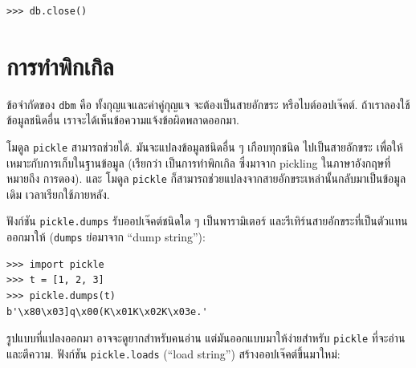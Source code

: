 \begin{verbatim}
>>> db.close()
\end{verbatim}
%


\section{การทำพิกเกิล}


ข้อจำกัดของ \texttt{dbm} คือ ทั้งกุญแจและค่าคู่กุญแจ จะต้องเป็นสายอักขระ หรือไบต์ออปเจ๊คต์.
ถ้าเราลองใช้ข้อมูลชนิดอื่น เราจะได้เห็นข้อความแจ้งข้อผิดพลาดออกมา.
 


โมดูล \texttt{pickle} สามารถช่วยได้.
มันจะแปลงข้อมูลชนิดอื่น ๆ เกือบทุกชนิด
ไปเป็นสายอักขระ เพื่อให้เหมาะกับการเก็บในฐานข้อมูล 
(เรียกว่า เป็นการทำพิกเกิล ซึ่งมาจาก pickling ในภาษาอังกฤษที่หมายถึง การดอง).
และ โมดูล \texttt{pickle} ก็สามารถช่วยแปลงจากสายอักขระเหล่านั้นกลับมาเป็นข้อมูลเดิม เวลาเรียกใช้ภายหลัง.


ฟังก์ชัน \texttt{pickle.dumps} รับออปเจ๊คต์ชนิดใด ๆ เป็นพารามิเตอร์
และรีเทิร์นสายอักขระที่เป็นตัวแทนออกมาให้ 
(\texttt{dumps} ย่อมาจาก ``dump string''):

\begin{verbatim}
>>> import pickle
>>> t = [1, 2, 3]
>>> pickle.dumps(t)
b'\x80\x03]q\x00(K\x01K\x02K\x03e.'
\end{verbatim}
%
%
รูปแบบที่แปลงออกมา อาจจะดูยากสำหรับคนอ่าน
แต่มันออกแบบมาให้ง่ายสำหรับ \texttt{pickle} ที่จะอ่านและตีความ.
ฟังก์ชัน \texttt{pickle.loads} (``load string'') สร้างออปเจ๊คต์ขึ้นมาใหม่:

